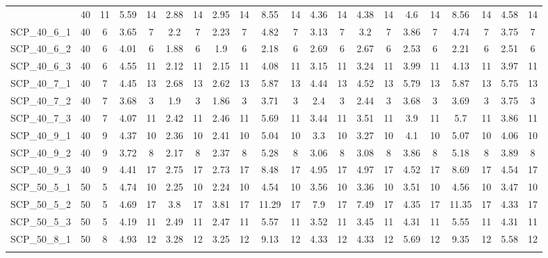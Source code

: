 \begin{sidewaystable}[!ht]
{\begin{tabular}{lcccccccccccccccccccc}
{SCP\_40\_11\_3 & 40 & 11 & 5.59 & 14 &  \textcolor{blue2}{2.88} & 14 & 2.95 & 14 & 8.55 & 14 & 4.36 & 14 & 4.38 & 14 & 4.6 & 14 & 8.56 & 14 & 4.58 & 14 \\
SCP\_40\_6\_1 & 40 & 6 & 3.65 & 7 &  \textcolor{blue2}{2.2} & 7 & 2.23 & 7 & 4.82 & 7 & 3.13 & 7 & 3.2 & 7 & 3.86 & 7 & 4.74 & 7 & 3.75 & 7 \\
SCP\_40\_6\_2 & 40 & 6 & 4.01 & 6 &  \textcolor{blue2}{1.88} & 6 & 1.9 & 6 & 2.18 & 6 & 2.69 & 6 & 2.67 & 6 & 2.53 & 6 & 2.21 & 6 & 2.51 & 6 \\
SCP\_40\_6\_3 & 40 & 6 & 4.55 & 11 &  \textcolor{blue2}{2.12} & 11 & 2.15 & 11 & 4.08 & 11 & 3.15 & 11 & 3.24 & 11 & 3.99 & 11 & 4.13 & 11 & 3.97 & 11 \\
SCP\_40\_7\_1 & 40 & 7 & 4.45 & 13 & 2.68 & 13 &  \textcolor{blue2}{2.62} & 13 & 5.87 & 13 & 4.44 & 13 & 4.52 & 13 & 5.79 & 13 & 5.87 & 13 & 5.75 & 13 \\
SCP\_40\_7\_2 & 40 & 7 & 3.68 & 3 & 1.9 & 3 &  \textcolor{blue2}{1.86} & 3 & 3.71 & 3 & 2.4 & 3 & 2.44 & 3 & 3.68 & 3 & 3.69 & 3 & 3.75 & 3 \\
SCP\_40\_7\_3 & 40 & 7 & 4.07 & 11 &  \textcolor{blue2}{2.42} & 11 & 2.46 & 11 & 5.69 & 11 & 3.44 & 11 & 3.51 & 11 & 3.9 & 11 & 5.7 & 11 & 3.86 & 11 \\
SCP\_40\_9\_1 & 40 & 9 & 4.37 & 10 &  \textcolor{blue2}{2.36} & 10 & 2.41 & 10 & 5.04 & 10 & 3.3 & 10 & 3.27 & 10 & 4.1 & 10 & 5.07 & 10 & 4.06 & 10 \\
SCP\_40\_9\_2 & 40 & 9 & 3.72 & 8 &  \textcolor{blue2}{2.17} & 8 & 2.37 & 8 & 5.28 & 8 & 3.06 & 8 & 3.08 & 8 & 3.86 & 8 & 5.18 & 8 & 3.89 & 8 \\
SCP\_40\_9\_3 & 40 & 9 & 4.41 & 17 & 2.75 & 17 &  \textcolor{blue2}{2.73} & 17 & 8.48 & 17 & 4.95 & 17 & 4.97 & 17 & 4.52 & 17 & 8.69 & 17 & 4.54 & 17 \\
SCP\_50\_5\_1 & 50 & 5 & 4.74 & 10 & 2.25 & 10 &  \textcolor{blue2}{2.24} & 10 & 4.54 & 10 & 3.56 & 10 & 3.36 & 10 & 3.51 & 10 & 4.56 & 10 & 3.47 & 10 \\
SCP\_50\_5\_2 & 50 & 5 & 4.69 & 17 &  \textcolor{blue2}{3.8} & 17 & 3.81 & 17 & 11.29 & 17 & 7.9 & 17 & 7.49 & 17 & 4.35 & 17 & 11.35 & 17 & 4.33 & 17 \\
SCP\_50\_5\_3 & 50 & 5 & 4.19 & 11 & 2.49 & 11 &  \textcolor{blue2}{2.47} & 11 & 5.57 & 11 & 3.52 & 11 & 3.45 & 11 & 4.31 & 11 & 5.55 & 11 & 4.31 & 11 \\
SCP\_50\_8\_1 & 50 & 8 & 4.93 & 12 & 3.28 & 12 &  \textcolor{blue2}{3.25} & 12 & 9.13 & 12 & 4.33 & 12 & 4.33 & 12 & 5.69 & 12 & 9.35 & 12 & 5.58 & 12 \\
}
\end{tabular}}
\end{sidewaystable}
